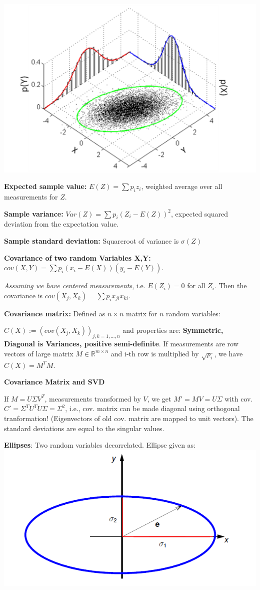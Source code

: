 \includegraphics[width=.7\textwidth]{images/chap3/joint_dist}

\textbf{Expected sample value:}  $E(Z) = \sum p_iz_i$, weighted average over all measurements for $Z$.

\textbf{Sample variance:} $Var(Z) = \sum p_i(Z_i - E(Z))^2$, expected squared deviation from the expectation value.

\textbf{Sample standard deviation:} Squareroot of variance is $\sigma(Z)$

\textbf{Covariance of two random Variables X,Y:} $cov(X,Y) = \sum p_i(x_i - E(X))(y_i - E(Y))$.

\textit{Assuming we have centered measurements}, i.e. $E(Z_i) = 0$ for all $Z_i$. Then the covariance is $cov(X_j,X_k) = \sum p_i x_{ji} x_{ki}$.

\textbf{Covariance matrix:} Defined as $n\times n$ matrix for $n$ random variables:

$C(X) := (cov(X_j,X_k))_{j,k=1,\dots,n}$ and properties are: \textbf{Symmetric, Diagonal is Variances, positive semi-definite}. If measurements are row vectors of large matrix $M \in \mathbb{R}^{m\times n}$ and i-th row is multiplied by $\sqrt{p_i}$, we have $C(X) = M^T M$.

\textbf{Covariance Matrix and SVD}

If $M = U \Sigma V^T$, measurements transformed by $V$, we get $M' = MV = U\Sigma$ with cov. $C' = \Sigma^T U^T U \Sigma = \Sigma^2$, i.e., cov. matrix can be made diagonal using orthogonal tranformation! (Eigenvectors of old cov. matrix are mapped to unit vectors). The standard deviations are equal to the singular values.

\textbf{Ellipses}: Two random variables decorrelated. Ellipse given as: \includegraphics[width=.3\textwidth]{images/chap3/ellipse}

